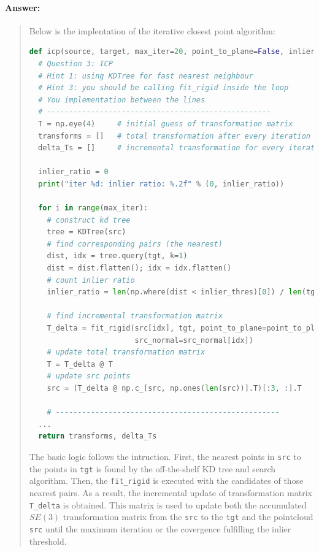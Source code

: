 \documentclass[11pt]{article}
\begin{document}
\paragraph{Answer:} 
\begin{quote}

Below is the implentation of the iterative closest point algorithm:

\begin{lstlisting}[language=Python, basicstyle=\scriptsize]
def icp(source, target, max_iter=20, point_to_plane=False, inlier_thres=0.1):
  # Question 3: ICP
  # Hint 1: using KDTree for fast nearest neighbour
  # Hint 3: you should be calling fit_rigid inside the loop
  # You implementation between the lines
  # ---------------------------------------------------
  T = np.eye(4)     # initial guess of transformation matrix 
  transforms = []   # total transformation after every iteration
  delta_Ts = []     # incremental transformation for every iteration

  inlier_ratio = 0
  print("iter %d: inlier ratio: %.2f" % (0, inlier_ratio))

  for i in range(max_iter):
    # construct kd tree
    tree = KDTree(src)
    # find corresponding pairs (the nearest)
    dist, idx = tree.query(tgt, k=1)
    dist = dist.flatten(); idx = idx.flatten()
    # count inlier ratio
    inlier_ratio = len(np.where(dist < inlier_thres)[0]) / len(tgt)

    # find incremental transformation matrix
    T_delta = fit_rigid(src[idx], tgt, point_to_plane=point_to_plane, \
                        src_normal=src_normal[idx])
    # update total transformation matrix
    T = T_delta @ T
    # update src points
    src = (T_delta @ np.c_[src, np.ones(len(src))].T)[:3, :].T

    # ---------------------------------------------------
  ...
  return transforms, delta_Ts
\end{lstlisting}

The basic logic follows the intruction. First, the nearest points in \texttt{src} to the points in \texttt{tgt} is found by the off-the-shelf KD tree and search algorithm. Then, the \texttt{fit\_rigid} is executed with the candidates of those nearest pairs. As a result, the incremental update of transformation matrix \texttt{T\_delta} is obtained. This matrix is used to update both the accumulated $SE(3)$ transformation matrix from the \texttt{src} to the \texttt{tgt} and the pointcloud \texttt{src} until the maximum iteration or the covergence fulfilling the inlier threshold. 


\end{quote}
\end{document}
